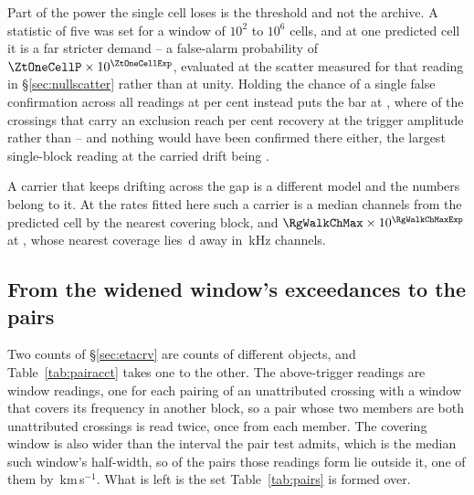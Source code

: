 Part of the power the single cell loses is the threshold and not the archive.
A statistic of five was set for a window of $10^{2}$ to $10^{6}$ cells, and at
one predicted cell it is a far stricter demand -- a false-alarm
probability of $\ZtOneCellP\times10^{\ZtOneCellExp}$, evaluated at the scatter
measured for that reading in \S\ref{sec:nullscatter} rather than at unity.
Holding the chance of a single false confirmation across all
\RcNRepeatMeas{} readings at \ZtFwPct{} per cent instead puts the bar at
\ZtTrialThr, where \HjNPowerTrial{} of the crossings that carry an exclusion
reach \RcPowerLevel{} per cent recovery at the trigger amplitude rather than
\HjNPowerHi{} -- and nothing would have been confirmed there either, the
largest single-block reading at the carried drift being \RcTMatched.

A carrier that keeps drifting across the gap is a different model and the
numbers belong to it. At the rates fitted here such a carrier is a median
\RgWalkChMed{} channels from the predicted cell by the nearest covering
block, and $\RgWalkChMax\times10^{\RgWalkChMaxExp}$ at \RgWalkStar, whose
nearest coverage lies \RgWalkGapD\,d away in \RgWalkChanKHz\,kHz channels.

\subsection{From the widened window's exceedances to the pairs}
\label{sec:pairacct}

Two counts of \S\ref{sec:etacrv} are counts of different objects, and
Table~\ref{tab:pairacct} takes one to the other. The \WdNExc{} above-trigger
readings are window readings, one for each pairing of an unattributed
crossing with a window that covers its frequency in another block, so a pair
whose two members are both unattributed crossings is read twice, once from
each member. The covering window is also wider than the interval the pair
test admits, which is the median such window's half-width, so \PaNPairBeyond{}
of the pairs those readings form lie outside it, one of them by
\PaDvBeyondMax\,km\,s$^{-1}$. What is left is the set
Table~\ref{tab:pairs} is formed over.

\begin{table}
\caption{The \WdNExc{} above-trigger readings of the widened recurrence
window, taken to the pairs the trajectory test is asked of. Each block of
rows is the one above it with one effect removed; the counts in the lower
block are those of Table~\ref{tab:pairs}.}
\label{tab:pairacct}
\footnotesize

\end{table}

